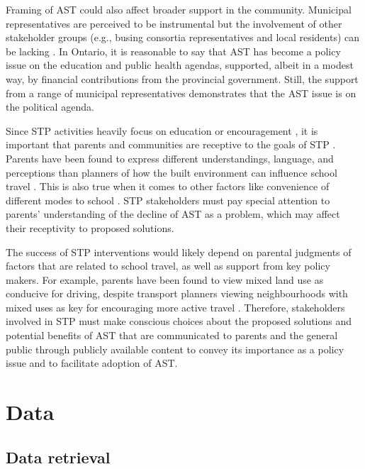\documentclass[preprint, 3p,
authoryear]{elsarticle} %
\begin{document}
Framing of AST could also affect broader support in the community.
Municipal representatives are perceived to be instrumental but the
involvement of other stakeholder groups (e.g., busing consortia
representatives and local residents) can be lacking
\citep{buttazzoniSupportingActiveSchool2018}. In Ontario, it is
reasonable to say that AST has become a policy issue on the education
and public health agendas, supported, albeit in a modest way, by
financial contributions from the provincial government. Still, the
support from a range of municipal representatives
\citep[see][]{buttazzoniSupportingActiveSchool2018, mammenPuttingSchoolTravel2015}
demonstrates that the AST issue is on the political agenda.

Since STP activities heavily focus on education or encouragement
\citep{buliungSchoolTravelPlanning2011, mammenActiveSchoolTravel2014, buttazzoniSupportingActiveSchool2018},
it is important that parents and communities are receptive to the goals
of STP \citep{buttazzoniSupportingActiveSchool2018}. Parents have been
found to express different understandings, language, and perceptions
than planners of how the built environment can influence school travel
\citep{buliungLivingJourneySchool2021}. This is also true when it comes
to other factors like convenience of different modes to school
\citep{langUnderstandingModalChoice2011}. STP stakeholders must pay
special attention to parents' understanding of the decline of AST as a
problem, which may affect their receptivity to proposed solutions.

The success of STP interventions would likely depend on parental
judgments of factors that are related to school travel, as well as
support from key policy makers. For example, parents have been found to
view mixed land use as conducive for driving, despite transport planners
viewing neighbourhoods with mixed uses as key for encouraging more
active travel \citep{buliungLivingJourneySchool2021}. Therefore,
stakeholders involved in STP must make conscious choices about the
proposed solutions and potential benefits of AST that are communicated
to parents and the general public through publicly available content to
convey its importance as a policy issue and to facilitate adoption of
AST.

\hypertarget{data}{%
\section{Data}\label{data}}

\hypertarget{data-retrieval}{%
\subsection{Data retrieval}\label{data-retrieval}}
\end{document}
